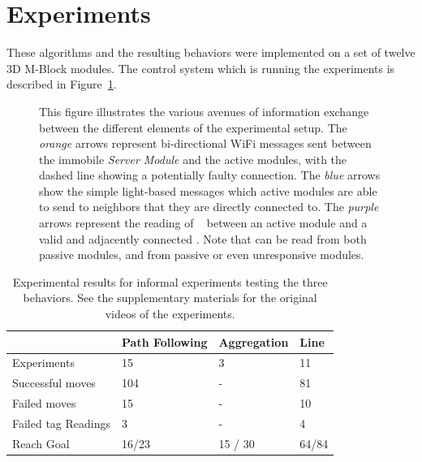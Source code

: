 \section{Experiments}
\label{sec:Experiments}

These algorithms and the resulting behaviors were implemented on a set of twelve 3D M-Block modules. The control system which is running the experiments is described in Figure~\ref{fig:electroncsChart}.

\begin{figure}[ht]

	
	
\caption{This figure illustrates the various avenues of information exchange between the different elements of the experimental setup. The \emph{orange} arrows represent bi-directional WiFi messages sent between the immobile \emph{Server Module} and the active modules, with the dashed line showing a potentially faulty connection. The \emph{blue} arrows show the simple light-based messages which active modules are able to send to neighbors that they are directly connected to. The \emph{purple} arrows represent the reading of \tagNamePlural~ between an active module and a valid and adjacently connected \tagName. Note that \tagNamePlural can be read from both passive modules, and from passive or even unresponsive modules.}
	
	\label{fig:electroncsChart}
\end{figure}

\begin{table}[h]
	\caption{Experimental results for informal experiments testing the three behaviors. See the supplementary materials for the original videos of the experiments.}
	
	\begin{tabular}{ p{2.4cm}  p{1.8cm}  p{1.4cm} p{1.3cm} }
		\hline
								& Path Following& Aggregation 	& Line		\\
		\hline
		Experiments				&  15 			& 3				& 11 		\\
		Successful moves		&  104			& -				& 81			\\
		Failed moves			&  15			& -				& 10			\\
		Failed tag Readings		&  3			& -				& 4			\\
		Reach Goal				&  16/23		& 15 / 30		& 64/84		\\

		
		
		
		
		
		
	\end{tabular}
	
	\label{tab:info}
\end{table}

